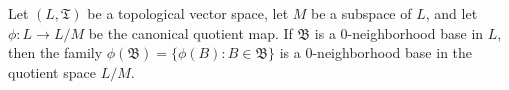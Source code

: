 Let $(L, \mathfrak{T})$ be a topological vector space, let $M$ be a subspace of $L$, and let $\phi : L \to L/M$ be the canonical quotient map. If $\mathfrak{B}$ is a $0$-neighborhood base in $L$, then the family $\phi(\mathfrak{B}) = \{\phi(B) : B \in \mathfrak{B}\}$ is a $0$-neighborhood base in the quotient space $L/M$.
